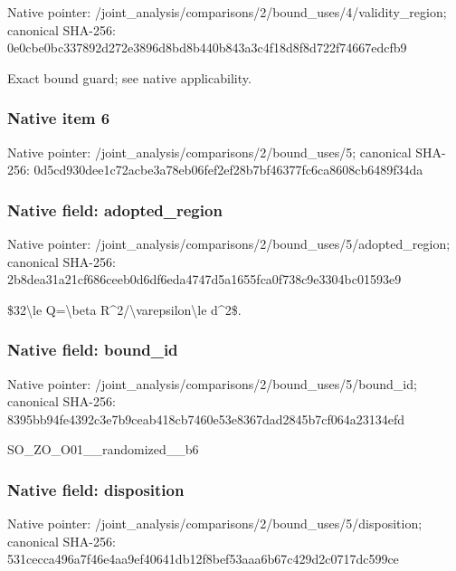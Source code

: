 \documentclass[10pt,a4paper]{article}
\begin{document}
Native pointer: /joint\_analysis/comparis\allowbreak{}ons/2/bound\_uses/4/valid\allowbreak{}ity\_region; canonical SHA-256: 0e0cbe0bc337892d272e3896\allowbreak{}d8bd8b440b843a3c4f18d8f8\allowbreak{}d722f74667edcfb9


Exact bound guard; see native applicability.


\subsubsection{Native item 6}


Native pointer: /joint\_analysis/comparis\allowbreak{}ons/2/bound\_uses/5; canonical SHA-256: 0d5cd930dee1c72acbe3a78e\allowbreak{}b06fef2ef28b7bf46377fc6c\allowbreak{}a8608cb6489f34da



\subsubsection{Native field: adopted\_region}


Native pointer: /joint\_analysis/comparis\allowbreak{}ons/2/bound\_uses/5/adopt\allowbreak{}ed\_region; canonical SHA-256: 2b8dea31a21cf686ceeb0d6d\allowbreak{}f6eda4747d5a1655fca0f738\allowbreak{}c9e3304bc01593e9


\$32\textbackslash{}le Q=\textbackslash{}beta R\textasciicircum{}2/\textbackslash{}varepsilon\textbackslash{}le d\textasciicircum{}2\$.


\subsubsection{Native field: bound\_id}


Native pointer: /joint\_analysis/comparis\allowbreak{}ons/2/bound\_uses/5/bound\allowbreak{}\_id; canonical SHA-256: 8395bb94fe4392c3e7b9ceab\allowbreak{}418cb7460e53e8367dad2845\allowbreak{}b7cf064a23134efd


SO\_ZO\_O01\_\_randomized\_\_b6


\subsubsection{Native field: disposition}


Native pointer: /joint\_analysis/comparis\allowbreak{}ons/2/bound\_uses/5/dispo\allowbreak{}sition; canonical SHA-256: 531cecca496a7f46e4aa9ef4\allowbreak{}0641db12f8bef53aaa6b67c4\allowbreak{}29d2c0717dc599ce
\end{document}
